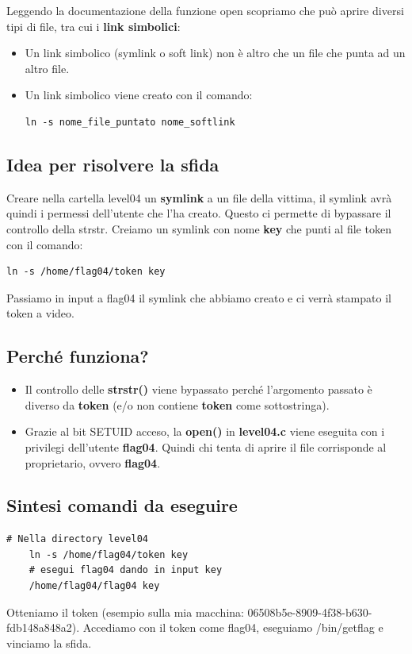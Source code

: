 Leggendo la documentazione della funzione open scopriamo che può aprire diversi tipi di file, tra cui i \textbf{link simbolici}:
\begin{itemize}
    \item Un link simbolico (symlink o soft link) non è altro che un file che punta ad un altro file.
    \item Un link simbolico viene creato con il comando:
    \begin{lstlisting}[style=bashstyle]
    ln -s nome_file_puntato nome_softlink
    \end{lstlisting}
\end{itemize}

\subsection{Idea per risolvere la sfida}
Creare nella cartella level04 un \textbf{symlink} a un file della vittima, il symlink avrà quindi i permessi dell'utente che l'ha creato. Questo ci permette di bypassare il controllo della strstr.
Creiamo un symlink con nome \textbf{key} che punti al file token con il comando:
\begin{lstlisting}[style=bashstyle]
    ln -s /home/flag04/token key
\end{lstlisting}
Passiamo in input a flag04 il symlink che abbiamo creato e ci verrà stampato il token a video.
\subsection{Perché funziona?}
\begin{itemize}
    \item Il controllo delle \textbf{strstr()} viene bypassato perché l’argomento passato è diverso da \textbf{token} (e/o non contiene \textbf{token} come sottostringa).
    \item Grazie al bit SETUID acceso, la \textbf{open()} in \textbf{level04.c} viene eseguita con i privilegi dell’utente \textbf{flag04}. Quindi chi tenta di aprire il file corrisponde al proprietario, ovvero \textbf{flag04}.
\end{itemize}

\subsection{Sintesi comandi da eseguire}
\begin{lstlisting}[style=bashstyle]
    # Nella directory level04
    ln -s /home/flag04/token key
    # esegui flag04 dando in input key
    /home/flag04/flag04 key
\end{lstlisting}
Otteniamo il token (esempio sulla mia macchina: 06508b5e-8909-4f38-b630-fdb148a848a2).
Accediamo con il token come ﬂag04, eseguiamo /bin/getﬂag e vinciamo la sfida.

